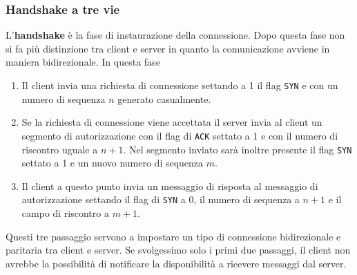 \subsubsection{Handshake a tre vie}
L'\textbf{handshake} è la fase di instaurazione della connessione. Dopo questa fase non si fa più
distinzione tra client e server in quanto la comunicazione avviene in maniera bidirezionale. In
questa fase
\begin{enumerate}
	\item Il client invia una richiesta di connessione settando a 1 il flag \verb|SYN| e con un
	      numero di sequenza $n$ generato casualmente.
	\item Se la richiesta di connessione viene accettata il server invia al client un segmento di
	      autorizzazione con il flag di \verb|ACK| settato a 1 e con il numero di riscontro uguale
	      a $n+1$. Nel segmento inviato sarà inoltre presente il flag \verb|SYN| settato a 1 e un
	      nuovo numero di sequenza $m$.
	\item Il client a questo punto invia un messaggio di risposta al messaggio di autorizzazione
	      settando il flag di \verb|SYN| a 0, il numero di sequenza a $n+1$ e il campo di riscontro
	      a $m+1$.
\end{enumerate}
Questi tre passaggio servono a impostare un tipo di connessione bidirezionale e paritaria tra
client e server. Se svolgessimo solo i primi due passaggi, il client non avrebbe la possibilità
di notificare la disponibilità a ricevere messaggi dal server.

